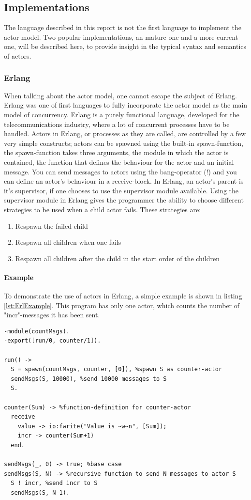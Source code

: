 \subsection{Implementations}\label{sub:implementations}
The language described in this report is not the first language to implement the actor model. Two popular implementations, an mature one and a more current one, will be described here, to provide insight in the typical syntax and semantics of actors.
\subsubsection{Erlang}
When talking about the actor model, one cannot escape the subject of Erlang. Erlang was one of first languages to fully incorporate the actor model as the main model of concurrency. Erlang is a purely functional language, developed for the telecommunications industry, where a lot of concurrent processes have to be handled. 
Actors in Erlang, or processes as they are called, are controlled by a few very simple constructs; actors can be spawned using the built-in spawn-function, the spawn-function takes three arguments, the module in which the actor is contained, the function that defines the behaviour for the actor and an initial message. You can send messages to actors using the bang-operator (!) and you can define an actor's behaviour in a receive-block.
In Erlang, an actor's parent is it's supervisor, if one chooses to use the supervisor module available. Using the supervisor module in Erlang gives the programmer the ability to choose different strategies to be used when a child actor fails. These strategies are:
\begin{enumerate}
  \item Respawn the failed child
  \item Respawn all children when one fails
  \item Respawn all children after the child in the start order of the children
\end{enumerate}

\paragraph{Example}
To demonstrate the use of actors in Erlang, a simple example is shown in listing \ref{lst:ErlExample}. This program has only one actor, which counts the number of "incr"-messages it has been sent.

\begin{lstlisting}[style=erlang, caption={A simple message-counter in Erlang.}, label=lst:ErlExample]
-module(countMsgs).
-export([run/0, counter/1]).

run() ->
  S = spawn(countMsgs, counter, [0]), %spawn S as counter-actor
  sendMsgs(S, 10000), %send 10000 messages to S
  S.
  
counter(Sum) -> %function-definition for counter-actor
  receive
    value -> io:fwrite("Value is ~w~n", [Sum]);
    incr -> counter(Sum+1)
  end.

sendMsgs(_, 0) -> true; %base case
sendMsgs(S, N) -> %recursive function to send N messages to actor S
  S ! incr, %send incr to S
  sendMsgs(S, N-1).
\end{lstlisting}


